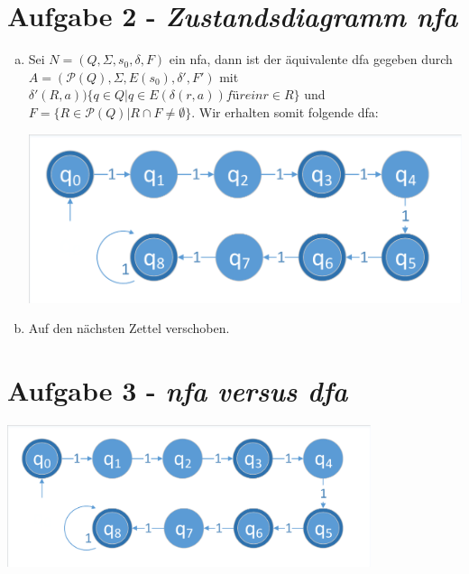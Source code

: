 \documentclass{article}
\begin{document}
\section*{Aufgabe 2 - \textit{Zustandsdiagramm nfa}}

\begin{enumerate}[a)]
	\item Sei $N = (Q, \Sigma, s_0, \delta, F)$ ein nfa, dann ist der äquivalente dfa gegeben durch $A = (\mathcal{P}(Q), \Sigma, E(s_0), \delta', F')$ mit $\delta'(R,a) ) \{q \in Q | q\in E(\delta(r,a)) für ein r\in R \}$ und $F = \{R \in \mathcal{P}(Q) | R\cap F \neq \emptyset\}$. Wir erhalten somit folgende dfa:
	
	\begin{minipage}{\textwidth}
		\centering\includegraphics[width=\textwidth,page=3,trim={2 2 2 4},clip]{dfas.pdf}
	\end{minipage}
	
	\item Auf den nächsten Zettel verschoben.
\end{enumerate}

\section*{Aufgabe 3 - \textit{nfa versus dfa}}

	\begin{minipage}{\textwidth}
		\centering\includegraphics[width=0.8\textwidth,page=4,trim={2 2 2 4},clip]{dfas.pdf}
	\end{minipage}\\
	
\end{document}
